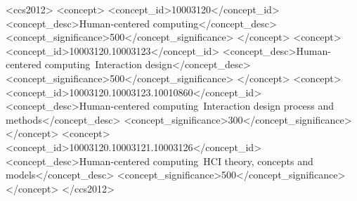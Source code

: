 \documentclass [sigconf, review, anonymous] {acmart}
\begin{document}

\begin{CCSXML}
<ccs2012>
   <concept>
       <concept_id>10003120</concept_id>
       <concept_desc>Human-centered computing</concept_desc>
       <concept_significance>500</concept_significance>
       </concept>
   <concept>
       <concept_id>10003120.10003123</concept_id>
       <concept_desc>Human-centered computing~Interaction design</concept_desc>
       <concept_significance>500</concept_significance>
       </concept>
   <concept>
       <concept_id>10003120.10003123.10010860</concept_id>
       <concept_desc>Human-centered computing~Interaction design process and methods</concept_desc>
       <concept_significance>300</concept_significance>
       </concept>
   <concept>
       <concept_id>10003120.10003121.10003126</concept_id>
       <concept_desc>Human-centered computing~HCI theory, concepts and models</concept_desc>
       <concept_significance>500</concept_significance>
       </concept>
 </ccs2012>
\end{CCSXML}




 
\maketitle
\end{document}

